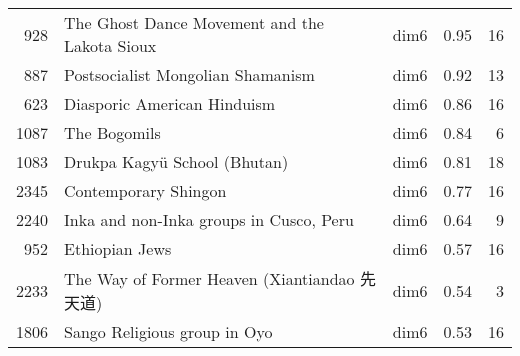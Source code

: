 \begin{tabular}{rllrr}
928 & The Ghost Dance Movement and the Lakota Sioux & dim6 & 0.95 & 16 \\
887 & Postsocialist Mongolian Shamanism & dim6 & 0.92 & 13 \\
623 & Diasporic American Hinduism & dim6 & 0.86 & 16 \\
1087 & The Bogomils & dim6 & 0.84 & 6 \\
1083 & Drukpa Kagyü School (Bhutan) & dim6 & 0.81 & 18 \\
2345 & Contemporary Shingon & dim6 & 0.77 & 16 \\
2240 & Inka and non-Inka groups in Cusco, Peru & dim6 & 0.64 & 9 \\
952 & Ethiopian Jews & dim6 & 0.57 & 16 \\
2233 & The Way of Former Heaven (Xiantiandao 先天道) & dim6 & 0.54 & 3 \\
1806 & Sango Religious group in Oyo & dim6 & 0.53 & 16 \\
\bottomrule
\end{tabular}
